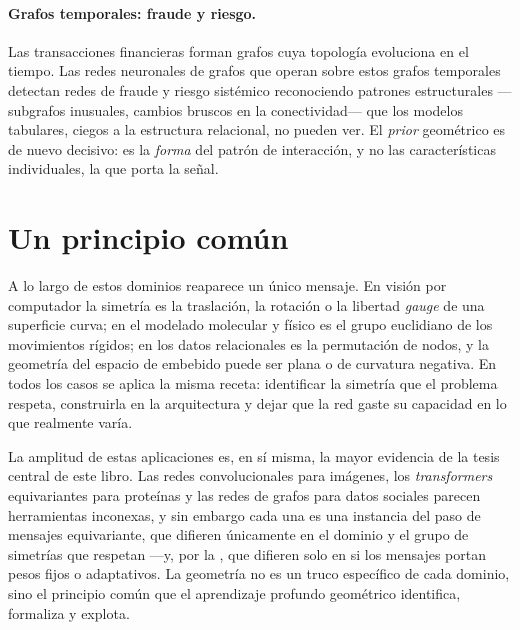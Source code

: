 \paragraph{Grafos temporales: fraude y riesgo.}
Las transacciones financieras forman grafos cuya topolog\'ia evoluciona en el
tiempo. Las redes neuronales de grafos que operan sobre estos grafos temporales
detectan redes de fraude y riesgo sist\'emico reconociendo patrones estructurales
---subgrafos inusuales, cambios bruscos en la conectividad--- que los modelos
tabulares, ciegos a la estructura relacional, no pueden ver. El \emph{prior}
geom\'etrico es de nuevo decisivo: es la \emph{forma} del patr\'on de
interacci\'on, y no las caracter\'isticas individuales, la que porta la se\~nal.

\section{Un principio com\'un}
\label{sec:apps:common}

A lo largo de estos dominios reaparece un \'unico mensaje. En visi\'on por
computador la simetr\'ia es la traslaci\'on, la rotaci\'on o la libertad
\emph{gauge} de una superficie curva; en el modelado molecular y f\'isico es el
grupo euclidiano de los movimientos r\'igidos; en los datos relacionales es la
permutaci\'on de nodos, y la geometr\'ia del espacio de embebido puede ser plana
o de curvatura negativa. En todos los casos se aplica la misma receta:
identificar la simetr\'ia que el problema respeta, construirla en la arquitectura
y dejar que la red gaste su capacidad en lo que realmente var\'ia.

\begin{remark}
\label{rem:apps:unification}
La amplitud de estas aplicaciones es, en s\'i misma, la mayor evidencia de la
tesis central de este libro. Las redes convolucionales para im\'agenes, los
\emph{transformers} equivariantes para prote\'inas y las redes de grafos para
datos sociales parecen herramientas inconexas, y sin embargo cada una es una
instancia del paso de mensajes equivariante, que difieren \'unicamente en el
dominio y el grupo de simetr\'ias que respetan ---y, por la
, que difieren solo en si los mensajes
portan pesos fijos o adaptativos. La geometr\'ia no es un truco espec\'ifico de
cada dominio, sino el principio com\'un que el aprendizaje profundo geom\'etrico
identifica, formaliza y explota.
\end{remark}

